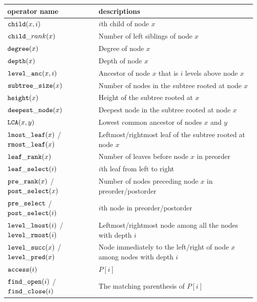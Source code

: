 \begin{table}[t]
\begin{center}
\begin{tabular} {|p{2.4cm}|p{5.2cm}|} \hline
operator name                             &descriptions        \\ \hline
$\mathtt{child}(x,i)$                         & $i$th child of node $x$\\
$\mathtt{child}\_rank(x)$                     & Number of left siblings of node $x$\\
$\mathtt{degree}(x)$                          &Degree of node $x$\\
$\mathtt{depth}(x)$                           & Depth of node $x$\\
$\mathtt{level\_anc}(x,i)$                      &Ancestor of node $x$ that is $i$ levels above node $x$ \\
$\mathtt{subtree\_size}(x)$                     &Number of nodes in the subtree rooted at node $x$ \\
$\mathtt{height}(x)$                          &Height of the subtree rooted at $x$ \\
$\mathtt{deepest\_node}(x)$                     &Deepest node in the subtree rooted at node $x$\\
$\mathtt{LCA}(x,y)$                           &Lowest common ancestor of nodes $x$ and $y$ \\
$\mathtt{lmost\_leaf}(x)$ /$\mathtt{rmost\_leaf}(x)$      &Leftmost/rightmost leaf of the subtree rooted at node $x$\\
$\mathtt{leaf\_rank}(x)$                        &Number of leaves before node $x$ in preorder\\
$\mathtt{leaf\_select}(i)$                      &$i$th leaf from left to right\\
$\mathtt{pre\_rank}(x)$ /$\mathtt{post\_select}(x)$             &Number of nodes preceding node $x$ in preorder/postorder\\
$\mathtt{pre\_select}$ /$\mathtt{post\_select}(i)$            &$i$th node in preorder/postorder\\       
$\mathtt{level\_lmost}(i)$ /$\mathtt{level\_rmost}(i)$       &Leftmost/rightmost node among all the nodes with depth $i$ \\
$\mathtt{level\_succ}(x)$ /$\mathtt{level\_pred}(x)$        &Node immediately to the left/right of node $x$ among nodes with depth $i$\\ \hline
$\mathtt{access}(i)$                           &$P[i]$        \\ 
$\mathtt{find\_open}(i)$ /$\mathtt{find\_close}(i)$       &The matching parenthesis of $P[i]$ \\

\end{tabular}
\end{center}
\end{table}
